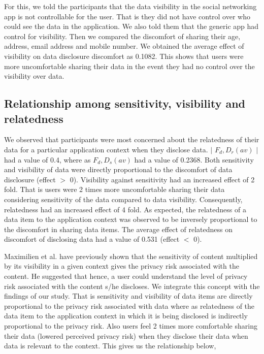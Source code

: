 \documentclass[conference]{IEEEtran}
\begin{document}
For this, we told the participants that the data visibility in the social networking app is not controllable for the user. That is they did not have control over who could see the data in the application. We also told them that the generic app had control for visibility. Then we compared the discomfort of sharing their age, address, email address and mobile number. We obtained the average effect of visibility on data disclosure discomfort as 0.1082. This shows that users were more uncomfortable sharing their data in the event they had no control over the visibility over data. 

\subsection {Relationship among sensitivity, visibility and relatedness}
We observed that participants were most concerned about the relatedness of their data for a particular application context when they disclose data. $\mid$ $F_d,D_r(av)$ $\mid$ had a value of 0.4, where as $F_d,D_s(av)$ had a value of 0.2368. Both sensitivity and visibility of data were directly proportional to the discomfort of data disclosure (effect $>$ 0). Visibility against sensitivity had an increased effect of 2 fold. That is users were 2 times more uncomfortable sharing their data considering sensitivity of the data compared to data visibility. Consequently, relatedness had an increased effect of 4 fold. As expected, the relatedness of a data item to the application context was observed to be inversely proportional to the discomfort in sharing data items. The average effect of relatedness on discomfort of disclosing data had a value of 0.531 (effect $<$ 0).

Maximilien et al. \cite {maximilien2009privacy} have previously shown that the sensitivity of content multiplied by its visibility in a given context gives the privacy risk associated with the content. He suggested that hence, a user could understand the level of privacy risk associated with the content s/he discloses. We integrate this concept with the findings of our study. That is sensitivity and visibility of data items are directly proportional to the privacy risk associated with data where as relatedness of the data item to the application context in which it is being disclosed is indirectly proportional to the privacy risk. Also users feel 2 times more comfortable sharing their data (lowered perceived privacy risk) when they disclose their data when data is relevant to the context. This gives us the relationship below,
\end{document}
